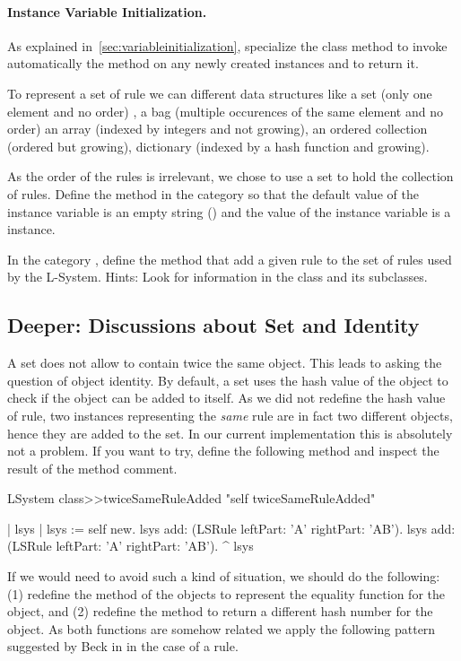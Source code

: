 \paragraph{Instance Variable Initialization.} As explained 
in~\ref{sec:variableinitialization}, specialize the class method
 to invoke automatically the method  on any newly
created instances and to return it.

To represent a set of rule we can different data structures like a set
(only one element and no order) , a bag (multiple occurences of the
same element and no order) an array (indexed by integers and not
growing), an ordered collection (ordered but growing), dictionary
(indexed by a hash function and growing). 

As the order of the rules is irrelevant, we chose to use a set to hold
the collection of rules. Define the method  in the
category  so that the default value of the 
instance variable is an empty string () and the value of the
 instance variable is a  instance.

In the category , define the method  that
add a given rule to the set of rules used by the L-System. Hints: Look
for information in the class  and its subclasses.

\subsection{Deeper: Discussions about Set and Identity} 
A set does not allow to contain twice the same object.  This leads to
asking the question of object identity. By default, a set uses the
hash value of the object to check if the object can be added to
itself. As we did not redefine the hash value of rule, two instances
representing the \emph{same} rule are in fact two different objects,
hence they are added to the set. In our current implementation this is
absolutely not a problem. If you want to try, define the following
method and inspect the result of the method comment.

\begin{method}
LSystem class>>twiceSameRuleAdded
   "self twiceSameRuleAdded"

   | lsys |
   lsys := self new. 
   lsys add: (LSRule leftPart: 'A' rightPart: 'AB').
   lsys add: (LSRule leftPart: 'A' rightPart: 'AB').
   ^ lsys 
\end{method}

If we would need to avoid such a kind of situation, we should do the
following: (1) redefine the \ct{=} method of the objects to represent
the equality function for the object, and (2) redefine the 
method to return a different hash number for the object. As both
functions are somehow related we apply the following pattern
suggested by Beck in \cite{Beck97a} in the case of a rule.  

